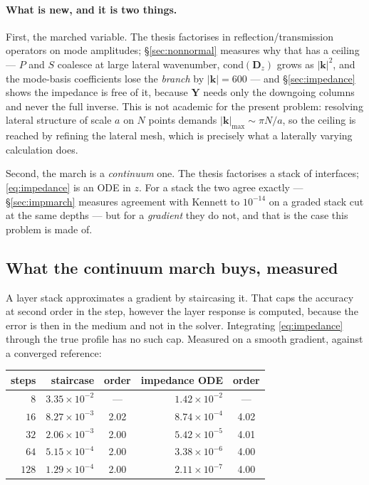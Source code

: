 \documentclass[11pt,a4paper]{article}
\newcommand{\bY}{\mathbf{Y}}
\begin{document}
\paragraph{What is new, and it is two things.}  First, the marched variable.
The thesis factorises in reflection/transmission operators on mode amplitudes;
\S\ref{sec:nonnormal} measures why that has a ceiling --- $P$ and $S$ coalesce
at large lateral wavenumber, $\mathrm{cond}(\mathbf{D}_z)$ grows as
$|\mathbf{k}|^2$, and the mode-basis coefficients lose the \emph{branch} by
$|\mathbf{k}| = 600$ --- and \S\ref{sec:impedance} shows the impedance is free
of it, because $\bY$ needs only the downgoing columns and never the full
inverse.  This is not academic for the present problem: resolving lateral
structure of scale $a$ on $N$ points demands
$|\mathbf{k}|_{\max}\sim\pi N/a$, so the ceiling is reached by refining the
lateral mesh, which is precisely what a laterally varying calculation does.

Second, the march is a \emph{continuum} one.  The thesis factorises a stack of
interfaces; \eqref{eq:impedance} is an ODE in $z$.  For a stack the two agree
exactly --- \S\ref{sec:impmarch} measures agreement with Kennett to
$10^{-14}$ on a graded stack cut at the same depths --- but for a
\emph{gradient} they do not, and that is the case this problem is made of.

\subsection{What the continuum march buys, measured}\label{sec:whatimbedbuys}

A layer stack approximates a gradient by staircasing it.  That caps the
accuracy at second order in the step, however the layer response is computed,
because the error is then in the medium and not in the solver.  Integrating
\eqref{eq:impedance} through the true profile has no such cap.  Measured on a
smooth gradient, against a converged reference:

\begin{center}
\begin{tabular}{@{}rrcrc@{}}
\toprule
steps & staircase & order & impedance ODE & order\\
\midrule
  $8$   & $3.35\times10^{-2}$ & ---  & $1.42\times10^{-2}$ & ---\\
  $16$  & $8.27\times10^{-3}$ & 2.02 & $8.74\times10^{-4}$ & 4.02\\
  $32$  & $2.06\times10^{-3}$ & 2.00 & $5.42\times10^{-5}$ & 4.01\\
  $64$  & $5.15\times10^{-4}$ & 2.00 & $3.38\times10^{-6}$ & 4.00\\
  $128$ & $1.29\times10^{-4}$ & 2.00 & $2.11\times10^{-7}$ & 4.00\\
\bottomrule
\end{tabular}
\end{center}
\end{document}
